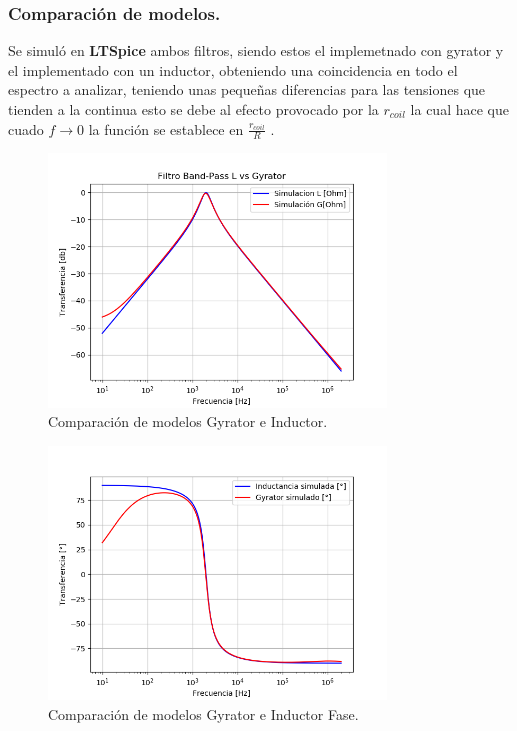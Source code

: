 \subsubsection{Comparación de modelos.}
Se simuló en \textbf{LTSpice} ambos filtros, siendo estos el implemetnado con gyrator y el implementado con un inductor, obteniendo una coincidencia en todo el espectro a analizar, teniendo unas pequeñas diferencias para las tensiones que tienden a la continua esto se debe al efecto provocado por la $r_{coil}$ la cual hace que cuado $f \rightarrow 0$ la función se establece en $\frac{r_{coil}}{R}$ .
\begin{figure}[H]	
	\centering
	\includegraphics[width=0.8\textwidth]{ImagenesEj2/simBP.PNG}
	\caption{Comparación de modelos Gyrator e Inductor.}
	\label{fig:gyrIndBP}
\end{figure}
\begin{figure}[H]	
	\centering
	\includegraphics[width=0.8\textwidth]{ImagenesEj2/simBPP.PNG}
	\caption{Comparación de modelos Gyrator e Inductor Fase.}
	\label{fig:gyrIndPBP}
\end{figure}

